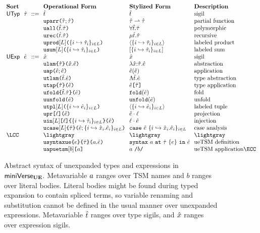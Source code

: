 \begin{figure}
\hspace{-6px}$\arraycolsep=3.5pt\begin{array}{lllllll}
\textbf{Sort} & & & \textbf{Operational Form} & \textbf{Stylized Form} & \textbf{Description}\\
\mathsf{UTyp} & \utau & ::= & \ut & \ut & \text{sigil}\\
&&& \auparr{\utau}{\utau} & \parr{\utau}{\utau} & \text{partial function}\\
&&& \auall{\ut}{\utau} & \forallt{\ut}{\utau} & \text{polymorphic}\\
&&& \aurec{\ut}{\utau} & \rect{\ut}{\utau} & \text{recursive}\\
&&& \auprod{\labelset}{\mapschema{\utau}{i}{\labelset}} & \prodt{\mapschema{\utau}{i}{\labelset}} & \text{labeled product}\\
&&& \ausum{\labelset}{\mapschema{\utau}{i}{\labelset}} & \sumt{\mapschema{\utau}{i}{\labelset}} & \text{labeled sum}\\
\mathsf{UExp} & \ue & ::= & \ux & \ux & \text{sigil}\\
&&& \aulam{\utau}{\ux}{\ue} & \lam{\ux}{\utau}{\ue} & \text{abstraction}\\
&&& \auap{\ue}{\ue} & \ap{\ue}{\ue} & \text{application}\\
&&& \autlam{\ut}{\ue} & \Lam{\ut}{\ue} & \text{type abstraction}\\
&&& \autap{\ue}{\utau} & \App{\ue}{\utau} & \text{type application}\\
&&& \aufold{\ut}{\utau}{\ue} & \fold{\ue} & \text{fold}\\
&&& \auunfold{\ue} & \unfold{\ue} & \text{unfold}\\
&&& \autpl{\labelset}{\mapschema{\ue}{i}{\labelset}} & \tpl{\mapschema{\ue}{i}{\labelset}} & \text{labeled tuple}\\
&&& \aupr{\ell}{\ue} & \prj{\ue}{\ell} & \text{projection}\\
&&& \auin{\labelset}{\ell}{\mapschema{\utau}{i}{\labelset}}{\ue} & \inj{\ell}{\ue} & \text{injection}\\
&&& \aucase{\labelset}{\utau}{\ue}{\mapschemab{\ux}{\ue}{i}{\labelset}} & \caseof{\ue}{\mapschemab{\ux}{\ue}{i}{\labelset}} & \text{case analysis}\\
\LCC  &  & & \lightgray & \lightgray & \lightgray \\
&&& \audefuetsm{\utau}{e}{\tsmv}{\ue} & \uesyntax{\tsmv}{\utau}{e}{\ue} & \text{ueTSM definition}\\ 
&&& \autsmap{b}{\tsmv} & \utsmap{\tsmv}{b} & \text{ueTSM application}\ECC
\end{array}$
\caption[Syntax of unexpanded types and expressions in $\miniVerseUE$]{Abstract syntax of unexpanded types and expressions in $\miniVerseUE$. Metavariable $a$ ranges over TSM names and $b$ ranges over literal bodies. Literal bodies might be found during typed expansion to contain spliced terms, so variable renaming and substitution cannot be defined in the usual manner over unexpanded expressions. Metavariable ${\hat{t}}$ ranges over type sigils, and ${\hat x}$ ranges over expression sigils.}
\label{fig:U-unexpanded-terms}
\end{figure}
